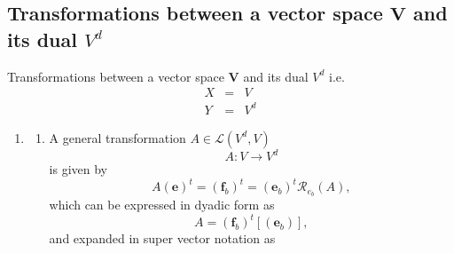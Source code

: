 \documentclass[aps,preprint]{revtex4}
\begin{document}
\subsection{Transformations between a vector space $\boldsymbol{V}$ and its
dual $V^{d}$}

Transformations between a vector space $\boldsymbol{V}$ and its dual $V^{d}$
i.e. 
\begin{eqnarray}
X &=&V \\
Y &=&V^{d}
\end{eqnarray}

\begin{enumerate}
\item 
\begin{enumerate}
\item A general transformation $A\in \mathcal{L}\left( V^{d},V\right) $ 
\begin{equation}
A:V\rightarrow V^{d}
\end{equation}%
is given by 
\begin{equation}
A\left( \boldsymbol{e}\right) ^{t}=\left( \boldsymbol{f}_{b}\right)
^{t}=\left( \boldsymbol{e}_{b}\right) ^{t}\mathcal{R}_{e_{b}}\left( A\right)
,
\end{equation}%
which can be expressed in dyadic form as%
\begin{equation}
A=\left( \boldsymbol{f}_{b}\right) ^{t}\left[ \left( \boldsymbol{e}%
_{b}\right) \right] ,
\end{equation}%
and expanded in super vector notation as


\end{enumerate}
\end{enumerate}
\end{document}
